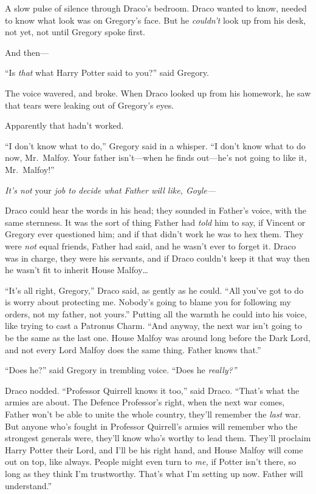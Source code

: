 A slow pulse of silence through Draco's bedroom. Draco wanted to know,
needed to know what look was on Gregory's face. But he \emph{couldn't}
look up from his desk, not yet, not until Gregory spoke first.

And then---

``Is \emph{that} what Harry Potter said to you?'' said Gregory.

The voice wavered, and broke. When Draco looked up from his homework, he
saw that tears were leaking out of Gregory's eyes.

Apparently that hadn't worked.

``I don't know what to do,'' Gregory said in a whisper. ``I don't know
what to do now, Mr.~Malfoy. Your father isn't---when he finds out---he's
not going to like it, Mr.~Malfoy!''

\emph{It's not} your \emph{job to decide what Father will like,
Goyle---}

Draco could hear the words in his head; they sounded in Father's voice,
with the same sternness. It was the sort of thing Father had \emph{told}
him to say, if Vincent or Gregory ever questioned him; and if that
didn't work he was to hex them. They were \emph{not} equal friends,
Father had said, and he wasn't ever to forget it. Draco was in charge,
they were his servants, and if Draco couldn't keep it that way then he
wasn't fit to inherit House Malfoy\ldots{}

``It's all right, Gregory,'' Draco said, as gently as he could. ``All
you've got to do is worry about protecting me. Nobody's going to blame
you for following my orders, not my father, not yours.'' Putting all the
warmth he could into his voice, like trying to cast a Patronus Charm.
``And anyway, the next war isn't going to be the same as the last one.
House Malfoy was around long before the Dark Lord, and not every Lord
Malfoy does the same thing. Father knows that.''

``Does he?'' said Gregory in trembling voice. ``Does he \emph{really?''}

Draco nodded. ``Professor Quirrell knows it too,'' said Draco. ``That's
what the armies are about. The Defence Professor's right, when the next
war comes, Father won't be able to unite the whole country, they'll
remember the \emph{last} war. But anyone who's fought in Professor
Quirrell's armies will remember who the strongest generals were, they'll
know who's worthy to lead them. They'll proclaim Harry Potter their
Lord, and I'll be his right hand, and House Malfoy will come out on top,
like always. People might even turn to \emph{me,} if Potter isn't there,
so long as they think I'm trustworthy. That's what I'm setting up now.
Father will understand.''

